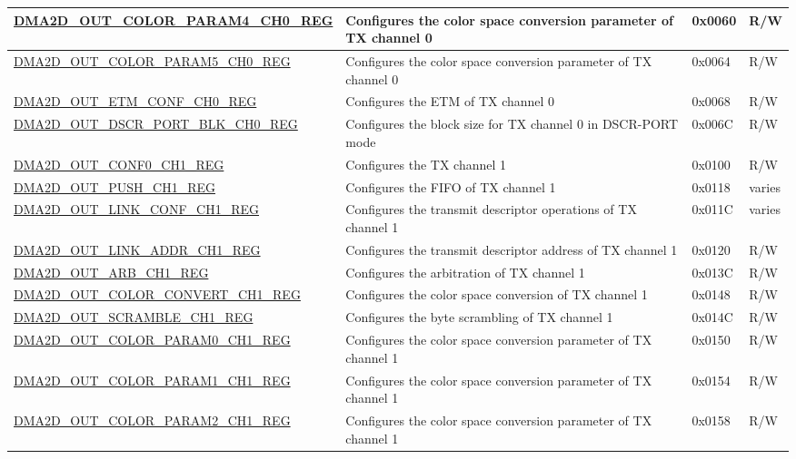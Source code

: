 \begin{longtable}{ | p{7cm} | p{11.5cm} | p{1.3cm} | p{2cm} | }
\hyperref[regdesc:DMA2DOUTCOLORPARAM4CHNREG]{DMA2D\_OUT\_COLOR\_PARAM4\_CH0\_REG} & Configures the color space conversion parameter of TX channel 0 & 0x0060 & R/W \\ \hline
\hyperref[regdesc:DMA2DOUTCOLORPARAM5CHNREG]{DMA2D\_OUT\_COLOR\_PARAM5\_CH0\_REG} & Configures the color space conversion parameter of TX channel 0 & 0x0064 & R/W \\ \hline
\hyperref[regdesc:DMA2DOUTETMCONFCHNREG]{DMA2D\_OUT\_ETM\_CONF\_CH0\_REG} & Configures the ETM of TX channel 0 & 0x0068 & R/W \\ \hline
\hyperref[regdesc:DMA2DOUTDSCRPORTBLKCHNREG]{DMA2D\_OUT\_DSCR\_PORT\_BLK\_CH0\_REG} & Configures the block size for TX channel 0 in DSCR-PORT mode & 0x006C & R/W \\ \hline
\hyperref[regdesc:DMA2DOUTCONF0CHNREG]{DMA2D\_OUT\_CONF0\_CH1\_REG} & Configures the TX channel 1 & 0x0100 & R/W \\ \hline
\hyperref[regdesc:DMA2DOUTPUSHCHNREG]{DMA2D\_OUT\_PUSH\_CH1\_REG} & Configures the FIFO of TX channel 1 & 0x0118 & varies \\ \hline
\hyperref[regdesc:DMA2DOUTLINKCONFCHNREG]{DMA2D\_OUT\_LINK\_CONF\_CH1\_REG} & Configures the transmit descriptor operations of TX channel 1 & 0x011C & varies \\ \hline
\hyperref[regdesc:DMA2DOUTLINKADDRCHNREG]{DMA2D\_OUT\_LINK\_ADDR\_CH1\_REG} & Configures the transmit descriptor address of TX channel 1 & 0x0120 & R/W \\ \hline
\hyperref[regdesc:DMA2DOUTARBCHNREG]{DMA2D\_OUT\_ARB\_CH1\_REG} & Configures the arbitration of TX channel 1 & 0x013C & R/W \\ \hline
\hyperref[regdesc:DMA2DOUTCOLORCONVERTCHNREG]{DMA2D\_OUT\_COLOR\_CONVERT\_CH1\_REG} & Configures the color space conversion of TX channel 1 & 0x0148 & R/W \\ \hline
\hyperref[regdesc:DMA2DOUTSCRAMBLECHNREG]{DMA2D\_OUT\_SCRAMBLE\_CH1\_REG} & Configures the byte scrambling of TX channel 1 & 0x014C & R/W \\ \hline
\hyperref[regdesc:DMA2DOUTCOLORPARAM0CHNREG]{DMA2D\_OUT\_COLOR\_PARAM0\_CH1\_REG} & Configures the color space conversion parameter of TX channel 1 & 0x0150 & R/W \\ \hline
\hyperref[regdesc:DMA2DOUTCOLORPARAM1CHNREG]{DMA2D\_OUT\_COLOR\_PARAM1\_CH1\_REG} & Configures the color space conversion parameter of TX channel 1 & 0x0154 & R/W \\ \hline
\hyperref[regdesc:DMA2DOUTCOLORPARAM2CHNREG]{DMA2D\_OUT\_COLOR\_PARAM2\_CH1\_REG} & Configures the color space conversion parameter of TX channel 1 & 0x0158 & R/W \\ \hline

\end{longtable}

